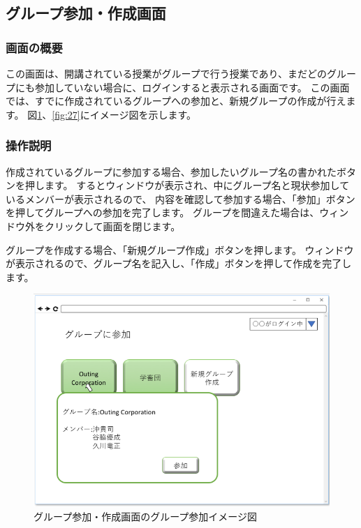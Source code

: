\subsection{グループ参加・作成画面}
\subsubsection{画面の概要}
この画面は、開講されている授業がグループで行う授業であり、まだどのグループにも参加していない場合に、ログインすると表示される画面です。
この画面では、すでに作成されているグループへの参加と、新規グループの作成が行えます。
図\ref{fig:26}、\ref{fig:27}にイメージ図を示します。

\subsubsection{操作説明}

作成されているグループに参加する場合、参加したいグループ名の書かれたボタンを押します。
するとウィンドウが表示され、中にグループ名と現状参加しているメンバーが表示されるので、
内容を確認して参加する場合、「参加」ボタンを押してグループへの参加を完了します。
グループを間違えた場合は、ウィンドウ外をクリックして画面を閉じます。

グループを作成する場合、「新規グループ作成」ボタンを押します。
ウィンドウが表示されるので、グループ名を記入し、「作成」ボタンを押して作成を完了します。

\begin{figure}[phtbp]
  \begin{center}
    \includegraphics[width=1\linewidth,clip]{./img/26.png}
    \caption{グループ参加・作成画面のグループ参加イメージ図}\label{fig:26}
  \end{center}
\end{figure}

